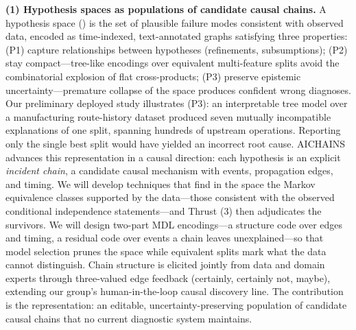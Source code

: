 \documentclass[12pt]{article}
\begin{document}
\textbf{(1) Hypothesis spaces as populations of candidate causal chains.} A hypothesis space () is the set of plausible failure modes consistent with observed data, encoded as time-indexed, text-annotated graphs satisfying three properties: (P1) capture relationships between hypotheses (refinements, subsumptions); (P2) stay compact---tree-like encodings over equivalent multi-feature splits avoid the combinatorial explosion of flat cross-products; (P3) preserve epistemic uncertainty---premature collapse of the space produces confident wrong diagnoses. Our preliminary deployed study illustrates (P3): an interpretable tree model over a manufacturing route-history dataset produced seven mutually incompatible explanations of one split, spanning hundreds of upstream operations. Reporting only the single best split would have yielded an incorrect root cause. AICHAINS advances this representation in a causal direction: each hypothesis is an explicit \emph{incident chain}, a candidate causal mechanism with events, propagation edges, and timing. We will develop techniques that find in the space the Markov equivalence classes supported by the data---those consistent with the observed conditional independence statements---and Thrust (3) then adjudicates the survivors. We will design two-part MDL encodings---a structure code over edges and timing, a residual code over events a chain leaves unexplained---so that model selection prunes the space while equivalent splits mark what the data cannot distinguish. Chain structure is elicited jointly from data and domain experts through three-valued edge feedback (certainly, certainly not, maybe), extending our group's human-in-the-loop causal discovery line. The contribution is the representation: an editable, uncertainty-preserving population of candidate causal chains that no current diagnostic system maintains.
\end{document}
